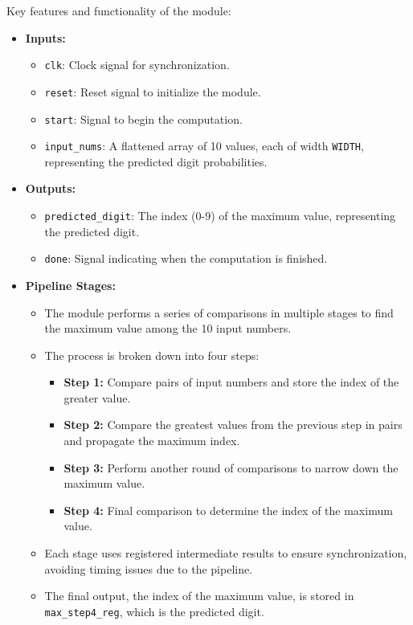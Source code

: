 \documentclass[11pt]{report}
\begin{document}
Key features and functionality of the module:

\begin{itemize}
    \item \textbf{Inputs:}
    \begin{itemize}
        \item \texttt{clk}: Clock signal for synchronization.
        \item \texttt{reset}: Reset signal to initialize the module.
        \item \texttt{start}: Signal to begin the computation.
        \item \texttt{input\_nums}: A flattened array of 10 values, each of width \texttt{WIDTH}, representing the predicted digit probabilities.
    \end{itemize}
    \item \textbf{Outputs:}
    \begin{itemize}
        \item \texttt{predicted\_digit}: The index (0-9) of the maximum value, representing the predicted digit.
        \item \texttt{done}: Signal indicating when the computation is finished.
    \end{itemize}
    \item \textbf{Pipeline Stages:}
    \begin{itemize}
        \item The module performs a series of comparisons in multiple stages to find the maximum value among the 10 input numbers.
        \item The process is broken down into four steps:
        \begin{itemize}
            \item \textbf{Step 1:} Compare pairs of input numbers and store the index of the greater value.
            \item \textbf{Step 2:} Compare the greatest values from the previous step in pairs and propagate the maximum index.
            \item \textbf{Step 3:} Perform another round of comparisons to narrow down the maximum value.
            \item \textbf{Step 4:} Final comparison to determine the index of the maximum value.
        \end{itemize}
        \item Each stage uses registered intermediate results to ensure synchronization, avoiding timing issues due to the pipeline.
        \item The final output, the index of the maximum value, is stored in \texttt{max\_step4\_reg}, which is the predicted digit.

\end{itemize}
\end{itemize}
\end{document}
